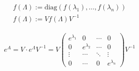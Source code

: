 \documentclass[a4paper,twocolumn]{article}
\begin{document}
		\begin{fdef}
			\begin{align*}
				f(\Lambda) := \text{diag}(f(\lambda_1), \ldots, f(\lambda_n))\\
				f(\Lambda) := V f(\Lambda) V^{-1}
			\end{align*}
		\end{fdef}
		\begin{fmerke}[e-Funktion]
			\begin{align*}
				e^{A} = V\cdot e^{\Lambda} V^{-1} = V 
				\left(
				\begin{array}{cccc}
					e^{\lambda_1} & 0 			   & \cdots & 0 \\
					0			   & e^{\lambda_2} & \cdots & 0 \\
					\vdots		   & \cdots		   & \ddots & \vdots\\
					0			   & \cdots		   & 0	    & e^{\lambda_n}
				\end{array}
				\right)
				V^{-1}
			\end{align*}
		\end{fmerke}
\end{document}
